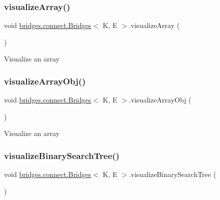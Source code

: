 \subsubsection{\texorpdfstring{visualize\+Array()}{visualizeArray()}}
{\footnotesize\ttfamily void \hyperlink{classbridges_1_1connect_1_1_bridges}{bridges.\+connect.\+Bridges}$<$ K, E $>$.visualize\+Array (\begin{DoxyParamCaption}{ }\end{DoxyParamCaption})\hspace{0.3cm}{\ttfamily [protected]}}

Visualize an array \hypertarget{classbridges_1_1connect_1_1_bridges_a7533ebb339527a3a824fc7af21a1d5c9}{}\label{classbridges_1_1connect_1_1_bridges_a7533ebb339527a3a824fc7af21a1d5c9} 
\subsubsection{\texorpdfstring{visualize\+Array\+Obj()}{visualizeArrayObj()}}
{\footnotesize\ttfamily void \hyperlink{classbridges_1_1connect_1_1_bridges}{bridges.\+connect.\+Bridges}$<$ K, E $>$.visualize\+Array\+Obj (\begin{DoxyParamCaption}{ }\end{DoxyParamCaption})\hspace{0.3cm}{\ttfamily [protected]}}

Visualize an array \hypertarget{classbridges_1_1connect_1_1_bridges_a283d29561d78a890f01c8735c18d17d0}{}\label{classbridges_1_1connect_1_1_bridges_a283d29561d78a890f01c8735c18d17d0} 
\subsubsection{\texorpdfstring{visualize\+Binary\+Search\+Tree()}{visualizeBinarySearchTree()}}
{\footnotesize\ttfamily void \hyperlink{classbridges_1_1connect_1_1_bridges}{bridges.\+connect.\+Bridges}$<$ K, E $>$.visualize\+Binary\+Search\+Tree (\begin{DoxyParamCaption}{ }\end{DoxyParamCaption})\hspace{0.3cm}{\ttfamily [protected]}}


